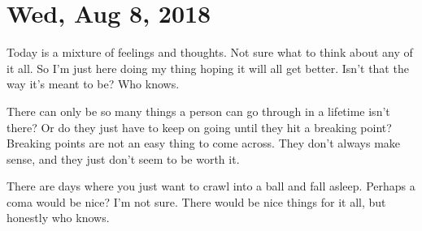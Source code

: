 \section{Wed, Aug 8, 2018}

Today is a mixture of feelings and thoughts. Not sure what to think about any of it
all. So I'm just here doing my thing hoping it will all get better. Isn't that the
way it's meant to be? Who knows.

There can only be so many things a person can go through in a lifetime isn't there?
Or do they just have to keep on going until they hit a breaking point? Breaking
points are not an easy thing to come across. They don't always make sense, and they
just don't seem to be worth it.

There are days where you just want to crawl into a ball and fall asleep. Perhaps a
coma would be nice? I'm not sure. There would be nice things for it all, but honestly
who knows.
